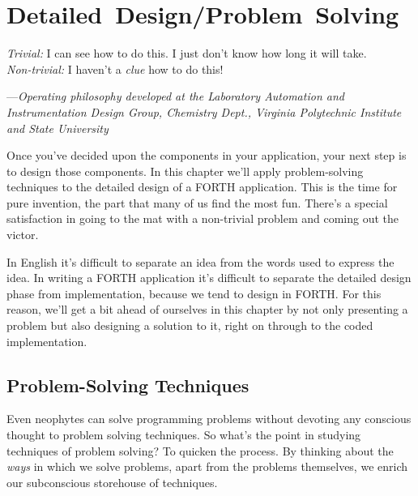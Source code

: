 

\chapter{Detailed~Design/\allowhyphens Problem~Solving}

\begin{tfquot}
\emph{Trivial:} I can see how to do this. I just don't know how long it
will take.\\
\emph{Non-trivial:} I haven't a \emph{clue} how to do this!

\begin{flushright}
---\emph{Operating philosophy developed at the Laboratory
Automation and Instrumentation Design Group,
Chemistry Dept., Virginia Polytechnic Institute and State University}
\end{flushright}
\end{tfquot}

Once you've decided upon the components in your application, your next
step is to design those components. In this chapter we'll apply
problem-solving techniques to the detailed design of a FORTH application.
This is the time for pure invention, the part that many of us find the most
fun. There's a special satisfaction in going to the mat with a non-trivial
problem and coming out the victor.

In English it's difficult to separate an idea from the words used to
express the idea. In writing a FORTH application it's difficult to
separate the detailed design phase from implementation, because we tend
to design in FORTH. For this reason, we'll get a bit ahead of ourselves in
this chapter by not only presenting a problem but also designing a solution
to it, right on through to the coded implementation.

\section{Problem-Solving Techniques}

Even neophytes can solve programming problems without devoting any
conscious thought to problem solving techniques. So what's the point in
studying techniques of problem solving? To quicken the process. By
thinking about the \emph{ways} in which we solve problems, apart from
the problems themselves, we enrich our subconscious storehouse of
techniques.

